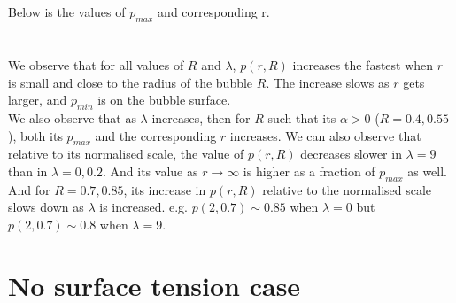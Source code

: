 \documentclass[10pt]{article}
\begin{document}
\noindent Below is the values of $p_{max}$ and corresponding r.\\
\\\\
We observe that for all values of $R$ and $\lambda$, $p(r,R)$ increases the fastest when $r$ is small and close to the radius of the bubble $R$. The increase slows as $r$ gets larger, and $p_{min}$ is on the bubble surface.\\
We also observe that as $\lambda$ increases, then for $R$ such that its $\alpha>0$ ($R=0.4,0.55$), both its $p_{max}$ and the corresponding $r$ increases. We can also observe that relative to its normalised scale, the value of $p(r,R)$ decreases slower in $\lambda =9$ than in $\lambda=0,0.2$. And its value as $r\to\infty$ is higher as a fraction of $p_{max}$ as well.\\
And for $R=0.7,0.85$, its increase in $p(r,R)$ relative to the normalised scale slows down as $\lambda$ is increased. e.g. $p(2,0.7)\sim0.85$ when $\lambda=0$ but $p(2,0.7)\sim0.8$ when $\lambda=9$.

\bigskip\bigskip

\section*{No surface tension case}
\end{document}
